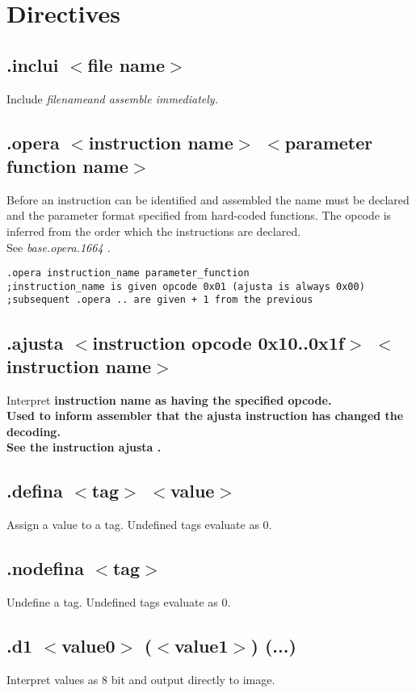 \documentclass[a4paper,11pt]{article}
\begin{document}
\pagebreak
\section{Directives}

\subsection{.inclui $<$file name$>$}
 Include \sl filename\rm and assemble immediately.

\subsection{.opera $<$instruction name$>$ $<$parameter function name$>$} 
 Before an instruction can be identified and assembled the name must be declared and the parameter format specified from hard-coded functions. The opcode is inferred from the order which the instructions are declared.\\
 See \sl base.opera.1664 \rm.

\begin{verbatim}
.opera instruction_name parameter_function
;instruction_name is given opcode 0x01 (ajusta is always 0x00)
;subsequent .opera .. are given + 1 from the previous
\end{verbatim}

\subsection{.ajusta $<$instruction opcode 0x10..0x1f$>$ $<$instruction name$>$}
 Interpret \bf instruction name \rm as having the specified opcode.\\
 Used to inform assembler that the \bf ajusta \rm instruction has changed the decoding.\\
 See the instruction \bf ajusta \rm.
 
\subsection{.defina $<$tag$>$ $<$value$>$} 
 Assign a value to a tag. Undefined tags evaluate as 0.

\subsection{.nodefina $<$tag$>$} 
 Undefine a tag. Undefined tags evaluate as 0.

\subsection{.d1 $<$value0$>$ ($<$value1$>$) (...)}
 Interpret values as 8 bit and output directly to image.
\end{document}
